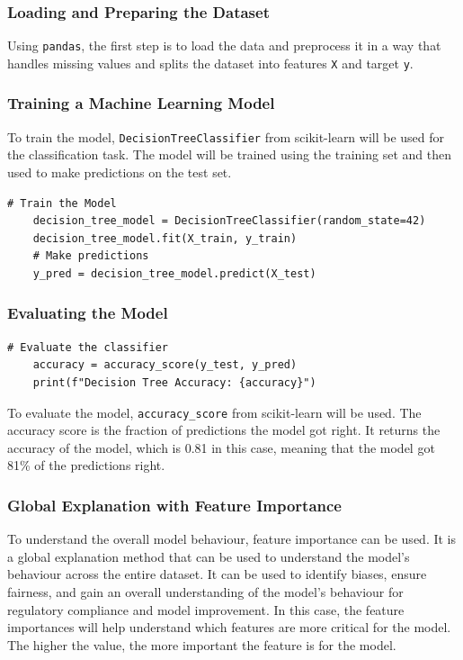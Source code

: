\documentclass[10pt,journal,compsoc]{IEEEtran}
\begin{document}
\subsubsection{Loading and Preparing the Dataset}
Using \texttt{pandas}, the first step is to load the data and preprocess it in a way that handles missing values and splits the dataset into features \texttt{X} and target \texttt{y}.

\subsubsection{Training a Machine Learning Model}
To train the model, \texttt{DecisionTreeClassifier} from scikit-learn will be used for the classification task. The model will be trained using the training set and then used to make predictions on the test set.

\begin{lstlisting}[caption=Training a Decision Tree Classifier]
    # Train the Model
    decision_tree_model = DecisionTreeClassifier(random_state=42)
    decision_tree_model.fit(X_train, y_train)
    # Make predictions
    y_pred = decision_tree_model.predict(X_test)
\end{lstlisting}

\subsubsection{Evaluating the Model}

\begin{lstlisting}[caption=Evaluating the Model]
    # Evaluate the classifier
    accuracy = accuracy_score(y_test, y_pred)
    print(f"Decision Tree Accuracy: {accuracy}")
\end{lstlisting}

To evaluate the model, \texttt{accuracy\_score} from scikit-learn will be used. The accuracy score is the fraction of predictions the model got right.
It returns the accuracy of the model, which is 0.81 in this case, meaning that the model got 81\% of the predictions right.

\subsubsection{Global Explanation with Feature Importance}

To understand the overall model behaviour, feature importance can be used. It is a global explanation method that can be used to understand the model's behaviour across the entire dataset. It can be used to identify biases, ensure fairness, and gain an overall understanding of the model's behaviour for regulatory compliance and model improvement. \cite{phillips2020four}
In this case, the feature importances will help understand which features are more critical for the model. The higher the value, the more important the feature is for the model.
\end{document}
